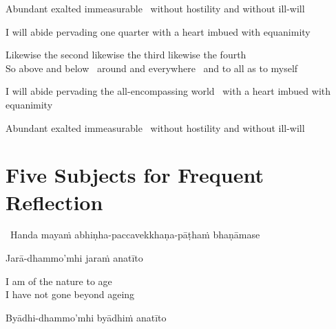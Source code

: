 \begin{english-hang}
  Abundant exalted immeasurable \breathmark\ without hostility and without ill-will
\end{english-hang}

\smallskip

\begin{english-hang}
  I will abide pervading one quarter with a heart imbued with equanimity
\end{english-hang}

\begin{english}
  Likewise the second likewise the third likewise the fourth\\
  So above and below \breathmark\ around and everywhere \breathmark\ and to all as to myself
\end{english}

\begin{english-hang}
  I will abide pervading the all-encompassing world \breathmark\ with a heart imbued with equanimity
\end{english-hang}

\begin{english-hang}
  Abundant exalted immeasurable \breathmark\ without hostility and without ill-will
\end{english-hang}

\suttaRef{[DN 13]}




\section{Five Subjects for Frequent Reflection}
\label{five-reflections}

\begin{leader}
  \anglebracketleft\ \hspace{-0.5mm}Handa mayaṁ abhiṇha-paccavekkhaṇa-pāṭhaṁ bhaṇāmase \hspace{-0.5mm}\anglebracketright\
\end{leader}

Jarā-dhammo'mhi jaraṁ anatīto

\begin{english}
  I am of the nature to age\\
  I have not gone beyond ageing
\end{english}

Byādhi-dhammo'mhi byādhiṁ anatīto

